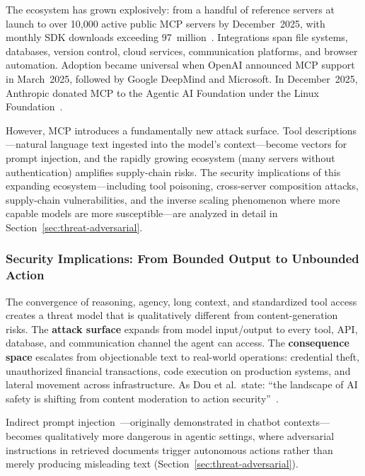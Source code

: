 The ecosystem has grown explosively: from a handful of reference servers at launch to over 10,000 active public MCP servers by December~2025, with monthly SDK downloads exceeding 97~million~\cite{mcp2025anniversary}. Integrations span file systems, databases, version control, cloud services, communication platforms, and browser automation. Adoption became universal when OpenAI announced MCP support in March~2025, followed by Google DeepMind and Microsoft. In December~2025, Anthropic donated MCP to the Agentic AI Foundation under the Linux Foundation~\cite{anthropic2025aaif}.

However, MCP introduces a fundamentally new attack surface. Tool descriptions---natural language text ingested into the model's context---become vectors for prompt injection, and the rapidly growing ecosystem (many servers without authentication) amplifies supply-chain risks. The security implications of this expanding ecosystem---including tool poisoning, cross-server composition attacks, supply-chain vulnerabilities, and the inverse scaling phenomenon where more capable models are more susceptible---are analyzed in detail in Section~\ref{sec:threat-adversarial}.


\subsubsection{Security Implications: From Bounded Output to Unbounded Action}
\label{sec:cap-implications}

The convergence of reasoning, agency, long context, and standardized tool access creates a threat model that is qualitatively different from content-generation risks. The \textbf{attack surface} expands from model input/output to every tool, API, database, and communication channel the agent can access. The \textbf{consequence space} escalates from objectionable text to real-world operations: credential theft, unauthorized financial transactions, code execution on production systems, and lateral movement across infrastructure. As Dou et al.\ state: ``the landscape of AI safety is shifting from content moderation to action security''~\cite{dou2026ajar}.

Indirect prompt injection~\cite{greshake2023ipi}---originally demonstrated in chatbot contexts---becomes qualitatively more dangerous in agentic settings, where adversarial instructions in retrieved documents trigger autonomous actions rather than merely producing misleading text (Section~\ref{sec:threat-adversarial}).

